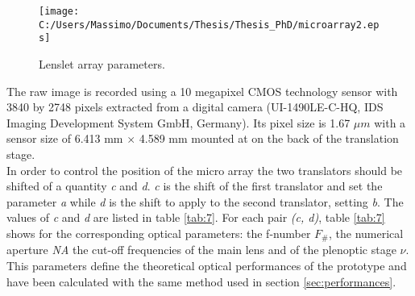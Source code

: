 \begin{figure}[H]
	\centering
	\texttt{[image: C:/Users/Massimo/Documents/Thesis/Thesis\_PhD/microarray2.eps]}
	\caption{\label{fig:micro array} Lenslet array parameters.}
\end{figure}
 The raw image is recorded using a 10 megapixel CMOS technology sensor with 3840 by 2748 pixels extracted from a digital camera (UI-1490LE-C-HQ, IDS Imaging Development System GmbH, Germany). Its pixel size is 1.67 $\mu m$ with a sensor size of 6.413 mm $\times$ 4.589 mm mounted at on the back of the translation stage. \\
 In order to control the position of the micro array the two translators should be shifted of a quantity \textit{c} and \textit{d}. \textit{c} is the shift of the first translator and set the parameter \textit{a} while \textit{d} is the shift to apply to the second translator, setting \textit{b}. The values of \textit{c} and \textit{d} are listed in table \ref{tab:7}.
 For each pair \textit{(c, d)}, table \ref{tab:7} shows for the corresponding optical parameters: the f-number $F_\#$, the numerical aperture \textit{NA} the cut-off frequencies of the main lens and of the plenoptic stage $\nu$. This parameters define the theoretical optical performances of the prototype and have been calculated with the same method used in section \ref{sec:performances}.
 \newpage
